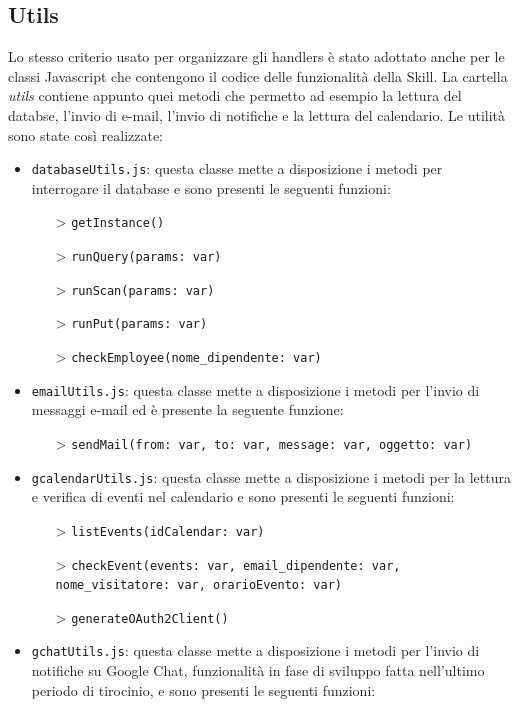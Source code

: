 \subsection{Utils}
\label{utils}
Lo stesso criterio usato per organizzare gli handlers è stato adottato anche per le classi Javascript che contengono il codice delle funzionalità della Skill. La cartella \textit{utils} contiene appunto quei metodi che permetto ad esempio la lettura del databse, l'invio di e-mail, l'invio di notifiche e la lettura del calendario. Le utilità sono state così realizzate:
\begin{itemize}
    \item \texttt{databaseUtils.js}: questa classe mette a disposizione i metodi per interrogare il database e sono presenti le seguenti funzioni:
    \begin{itemize}
        \item[>] \texttt{getInstance()}
        \item[>] \texttt{runQuery(params: var)}
        \item[>] \texttt{runScan(params: var)}
        \item[>] \texttt{runPut(params: var)}
        \item[>] \texttt{checkEmployee(nome\_dipendente: var)}
    \end{itemize}
    \item \texttt{emailUtils.js}: questa classe mette a disposizione i metodi per l'invio di messaggi e-mail ed è presente la seguente funzione:
    \begin{itemize}
        \item[>] \texttt{sendMail(from: var, to: var, message: var, oggetto: var)}
    \end{itemize}
    \item \texttt{gcalendarUtils.js}: questa classe mette a disposizione i metodi per la lettura e verifica di eventi nel calendario e sono presenti le seguenti funzioni:
    \begin{itemize}
        \item[>] \texttt{listEvents(idCalendar: var)}
        \item[>] \texttt{checkEvent(events: var, email\_dipendente: var, nome\_visitatore: var, orarioEvento: var)}
        \item[>] \texttt{generateOAuth2Client()}
    \end{itemize}
    \item \texttt{gchatUtils.js}: questa classe mette a disposizione i metodi per l'invio di notifiche su Google Chat, funzionalità in fase di sviluppo fatta nell'ultimo periodo di tirocinio, e sono presenti le seguenti funzioni:

\end{itemize}
